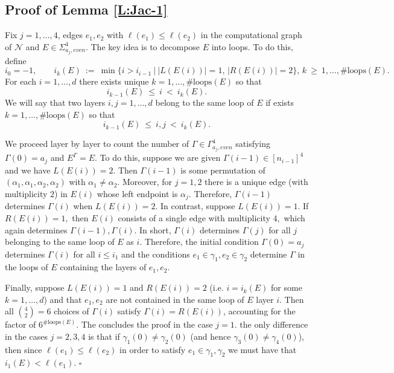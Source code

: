 \documentclass[11pt, reqno]{amsart}
\newcommand{\abs}[1]{\ensuremath{\left| #1 \right|}}
\newcommand{\set}[1]{\ensuremath{\{#1\}}}
\newcommand{\mN}{\mathcal N}
\begin{document}
\subsection{Proof of Lemma \ref{L:Jac-1}}\label{S:Jac-1-pf}
Fix $j=1,\ldots, 4$, edges $e_1,e_2$ with $\ell(e_1)\leq \ell(e_2)$ in the computational graph of $\mN$ and $E\in \Sigma_{a_j, even}^4$. The key idea is to decompose $E$ into loops. To do this, define 
\[i_0 =-1,\qquad i_k(E)~:=~\min\set{i>i_{i-1}~|~\abs{L(E(i))}=1,\, \abs{R(E(i))}=2},\, k~\geq~ 1,\ldots, \#\text{loops}(E).\]
For each $i=1,\ldots, d$ there exists unique $k=1,\ldots, \#\text{loops}(E)$ so that
\[i_{k-1}(E)~\leq~i~<~i_k(E).\]
We will say that two layers $i,j=1,\ldots, d$ belong to the same loop of $E$ if exists $k=1,\ldots, \#\text{loops}(E)$ so that
\[i_{k-1}(E)~\leq~i,j~<~i_k(E).\]



We proceed layer by layer to count the number of $\Gamma\in \Gamma_{a_j, even}^4$ satisfying $\Gamma(0)=a_j$ and $E^\Gamma=E.$ To do this, suppose we are given $\Gamma(i-1)\in [n_{i-1}]^4$ and we have $L(E(i))=2$. Then $\Gamma(i-1)$ is some permutation of $(\alpha_1,\alpha_1, \alpha_2,\alpha_2)$ with $\alpha_1\neq \alpha_2.$ Moreover, for $j=1,2$ there is a unique edge (with multiplicity $2$) in $E(i)$ whose left endpoint is $\alpha_j.$ Therefore, $\Gamma(i-1)$ determines $\Gamma(i)$ when $L(E(i))=2.$ In contrast, suppose $L(E(i))=1.$ If $R(E(i))=1,$ then $E(i)$ consists of a single edge with multiplicity $4,$ which again determines $\Gamma(i-1),\Gamma(i)$. In short, $\Gamma(i)$ determines $\Gamma(j)$ for all $j$ belonging to the same loop of $E$ as $i.$ Therefore, the initial condition $\Gamma(0)=a_j$ determines $\Gamma(i)$ for all $i\leq i_1$ and the conditions $e_1\in \gamma_1,e_2\in \gamma_2$ determine $\Gamma$ in the loops of $E$ containing the layers of $e_1,e_2.$ 

Finally, suppose $L(E(i))=1$ and $R(E(i))=2$ (i.e. $i=i_k(E)$ for some $k=1,\ldots,d$) and that $e_1,e_2$ are not contained in the same loop of $E$ layer $i$. Then all $\binom{4}{2}=6$ choices of $\Gamma(i)$  satisfy $\Gamma(i)=R(E(i))$, accounting for the factor of $6^{\#\text{loops}(E)}$. The concludes the proof in the case $j=1.$ the only difference in the cases $j=2,3,4$ is that if $\gamma_1(0)\neq \gamma_2(0)$ (and hence $\gamma_3(0)\neq \gamma_4(0)$), then since $\ell(e_1)\leq \ell(e_2)$ in order to satisfy $e_1\in \gamma_1,\gamma_2$ we must have that $i_1(E)<\ell(e_1).$ \hfill $\square$ 
\end{document}
